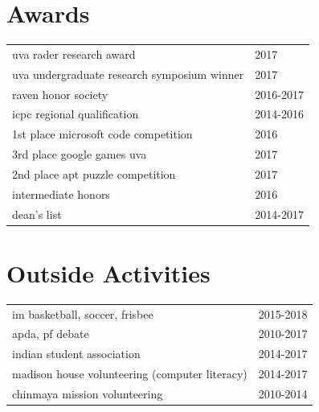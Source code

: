 \begin{minipage}[t]{0.675\textwidth}
\sectionspace %

\section{Awards} 
\begin{tabular}{m{7.5cm}l}
uva rader research award & 2017\\
uva undergraduate research symposium winner & 2017\\
raven honor society & 2016-2017\\
icpc regional qualification & 2014-2016\\
1st place microsoft code competition & 2016\\
3rd place google games uva & 2017\\
2nd place apt puzzle competition & 2017\\
intermediate honors & 2016\\
dean's list & 2014-2017\\
\end{tabular}
\sectionspace %

\section{Outside Activities} 
\begin{tabular}{m{7.5cm}l}
im basketball, soccer, frisbee & 2015-2018\\
apda, pf debate & 2010-2017\\
indian student association & 2014-2017\\
madison house volunteering (computer literacy) & 2014-2017 \\
chinmaya mission volunteering & 2010-2014
\end{tabular}

\end{minipage} %
\vspace*{\fill}
\center{\textcolor{gray}{2/2}}